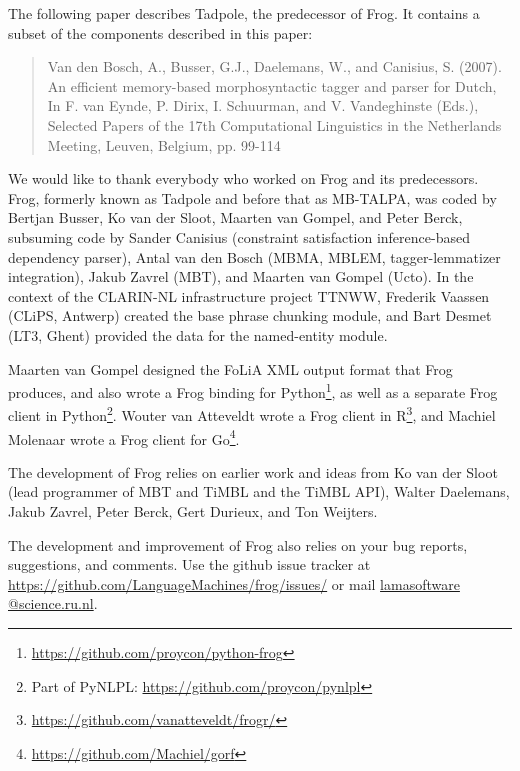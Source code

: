 \documentclass{book}
\begin{document}
The following paper describes Tadpole, the predecessor of Frog. It contains a
subset of the components described in this paper:

\begin{quotation}
Van den Bosch, A., Busser, G.J., Daelemans, W., and Canisius, S. (2007). An efficient memory-based morphosyntactic tagger and parser for Dutch, In F. van Eynde, P. Dirix, I. Schuurman, and V. Vandeghinste (Eds.), Selected Papers of the 17th Computational Linguistics in the Netherlands Meeting, Leuven, Belgium, pp. 99-114
\end{quotation}

We would like to thank everybody who worked on Frog and its predecessors.
Frog, formerly known as Tadpole and before that as MB-TALPA, was coded by
Bertjan Busser, Ko van der Sloot, Maarten van Gompel, and Peter Berck,
subsuming code by Sander Canisius (constraint satisfaction inference-based
dependency parser), Antal van den Bosch (MBMA, MBLEM, tagger-lemmatizer
integration), Jakub Zavrel (MBT), and Maarten van Gompel (Ucto). In the context
of the CLARIN-NL infrastructure project TTNWW, Frederik Vaassen (CLiPS,
Antwerp) created the base phrase chunking module, and Bart Desmet (LT3, Ghent)
provided the data for the named-entity module.

Maarten van Gompel designed the FoLiA XML output format that Frog produces, and
also wrote a Frog binding for
Python\footnote{\url{https://github.com/proycon/python-frog}}, as well as a
separate Frog client in Python\footnote{Part of PyNLPL:
\url{https://github.com/proycon/pynlpl}}. Wouter van Atteveldt wrote a Frog client in
R\footnote{\url{https://github.com/vanatteveldt/frogr/}}, and Machiel Molenaar
wrote a Frog client for Go\footnote{\url{https://github.com/Machiel/gorf}}.

The development of Frog relies on earlier work and ideas from Ko van der Sloot
(lead programmer of MBT and TiMBL and the TiMBL API), Walter Daelemans, Jakub
Zavrel, Peter Berck, Gert Durieux, and Ton Weijters.

The development and improvement of Frog also relies on your bug reports,
suggestions, and comments. Use the github issue tracker at
\url{https://github.com/LanguageMachines/frog/issues/} or mail \url{lamasoftware
@science.ru.nl}.






\appendix
\end{document}
